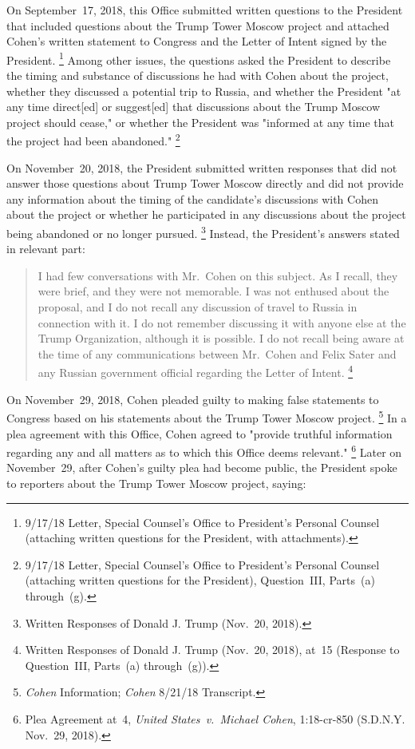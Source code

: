 On September~17, 2018, this Office submitted written questions to the President that included questions about the Trump Tower Moscow project and attached Cohen's written statement to Congress and the Letter of Intent signed by the President.%
\footnote{9/17/18 Letter, Special Counsel's Office to President's Personal Counsel (attaching written questions for the President, with attachments).}
Among other issues, the questions asked the President to describe the timing and substance of discussions he had with Cohen about the project, whether they discussed a potential trip to Russia, and whether the President "at any time direct[ed] or suggest[ed] that discussions about the Trump Moscow project should cease," or whether the President was "informed at any time that the project had been abandoned."%
\footnote{9/17/18 Letter, Special Counsel's Office to President's Personal Counsel (attaching written questions for the President), Question~III, Parts~(a) through~(g).}

On November~20, 2018, the President submitted written responses that did not answer those questions about Trump Tower Moscow directly and did not provide any information about the timing of the candidate's discussions with Cohen about the project or whether he participated in any discussions about the project being abandoned or no longer pursued.%
\footnote{Written Responses of Donald J. Trump (Nov.~20, 2018).}
Instead, the President's answers stated in relevant part:

\begin{quote}
I had few conversations with Mr.~Cohen on this subject.
As I recall, they were brief, and they were not memorable.
I was not enthused about the proposal, and I do not recall any discussion of travel to Russia in connection with it.
I do not remember discussing it with anyone else at the Trump Organization, although it is possible.
I do not recall being aware at the time of any communications between Mr.~Cohen and Felix Sater and any Russian government official regarding the Letter of Intent.%
\footnote{Written Responses of Donald J. Trump (Nov.~20, 2018), at~15 (Response to Question~III, Parts~(a) through~(g)).}
\end{quote}

On November~29, 2018, Cohen pleaded guilty to making false statements to Congress based on his statements about the Trump Tower Moscow project.%
\footnote{\textit{Cohen} Information;
\textit{Cohen} 8/21/18 Transcript.}
In a plea agreement with this Office, Cohen agreed to "provide truthful information regarding any and all matters as to which this Office deems relevant."%
\footnote{Plea Agreement at~4, \textit{United States~v.\ Michael Cohen}, 1:18-cr-850 (S.D.N.Y. Nov.~29, 2018).}
Later on November~29, after Cohen's guilty plea had become public, the President spoke to reporters about the Trump Tower Moscow project, saying:

